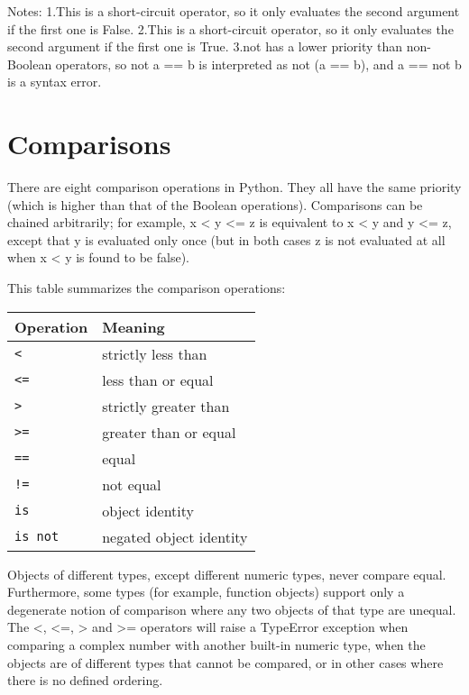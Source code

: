   

Notes:
1.This is a short-circuit operator, so it only evaluates the second argument if the first one is False.
2.This is a short-circuit operator, so it only evaluates the second argument if the first one is True.
3.not has a lower priority than non-Boolean operators, so not a == b is interpreted as not (a == b), and a == not b is a syntax error.

\section{Comparisons}

There are eight comparison operations in Python. They all have the same priority (which is higher than that of the Boolean operations). Comparisons can be chained arbitrarily; for example, x < y <= z is equivalent to x < y and y <= z, except that y is evaluated only once (but in both cases z is not evaluated at all when x < y is found to be false).

This table summarizes the comparison operations:


\begin{table}[ht]
	\centering
	\begin{tabular}{|l|l|}
		\hline
		Operation & Meaning \\
		\hline
		\verb|<| & strictly less than \\
		\verb|<=| & less than or equal  \\							
		\verb|>| & strictly greater than \\
		\verb|>=| & greater than or equal  \\							
		\verb|==| & equal \\
		\verb|!=| & not equal  \\							
		\verb|is| & object identity \\
		\verb|is not| & negated object identity  \\							
		\hline
	\end{tabular}
\end{table}


Objects of different types, except different numeric types, never compare equal. Furthermore, some types (for example, function objects) support only a degenerate notion of comparison where any two objects of that type are unequal. The <, <=, > and >= operators will raise a TypeError exception when comparing a complex number with another built-in numeric type, when the objects are of different types that cannot be compared, or in other cases where there is no defined ordering.

